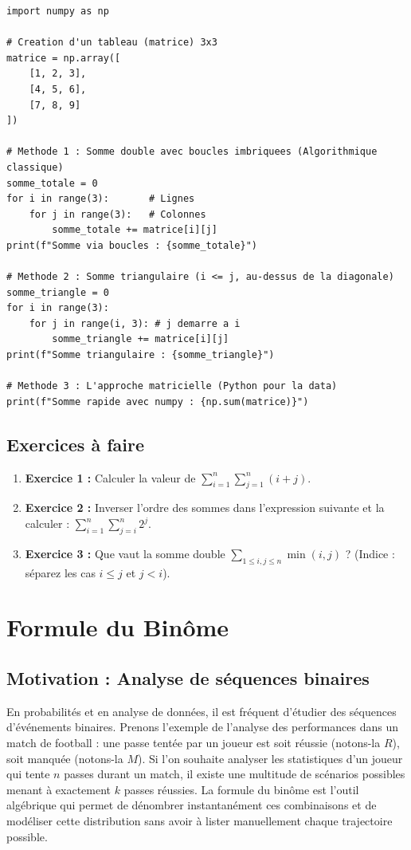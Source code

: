 \documentclass[12pt,a4paper]{report}
\begin{document}
\begin{lstlisting}
import numpy as np

# Creation d'un tableau (matrice) 3x3
matrice = np.array([
    [1, 2, 3],
    [4, 5, 6],
    [7, 8, 9]
])

# Methode 1 : Somme double avec boucles imbriquees (Algorithmique classique)
somme_totale = 0
for i in range(3):       # Lignes
    for j in range(3):   # Colonnes
        somme_totale += matrice[i][j]
print(f"Somme via boucles : {somme_totale}")

# Methode 2 : Somme triangulaire (i <= j, au-dessus de la diagonale)
somme_triangle = 0
for i in range(3):
    for j in range(i, 3): # j demarre a i
        somme_triangle += matrice[i][j]
print(f"Somme triangulaire : {somme_triangle}")

# Methode 3 : L'approche matricielle (Python pour la data)
print(f"Somme rapide avec numpy : {np.sum(matrice)}")
\end{lstlisting}

\subsection{Exercices à faire}
\begin{enumerate}
    \item \textbf{Exercice 1 :} Calculer la valeur de $\sum_{i=1}^{n} \sum_{j=1}^{n} (i+j)$.
    \item \textbf{Exercice 2 :} Inverser l'ordre des sommes dans l'expression suivante et la calculer : $\sum_{i=1}^{n} \sum_{j=i}^{n} 2^j$.
    \item \textbf{Exercice 3 :} Que vaut la somme double $\sum_{1 \le i,j \le n} \min(i,j)$ ? (Indice : séparez les cas $i \le j$ et $j < i$).
\end{enumerate}

\section{Formule du Binôme}

\subsection{Motivation : Analyse de séquences binaires}
En probabilités et en analyse de données, il est fréquent d'étudier des séquences d'événements binaires. Prenons l'exemple de l'analyse des performances dans un match de football : une passe tentée par un joueur est soit réussie (notons-la $R$), soit manquée (notons-la $M$). Si l'on souhaite analyser les statistiques d'un joueur qui tente $n$ passes durant un match, il existe une multitude de scénarios possibles menant à exactement $k$ passes réussies. La formule du binôme est l'outil algébrique qui permet de dénombrer instantanément ces combinaisons et de modéliser cette distribution sans avoir à lister manuellement chaque trajectoire possible.
\end{document}
